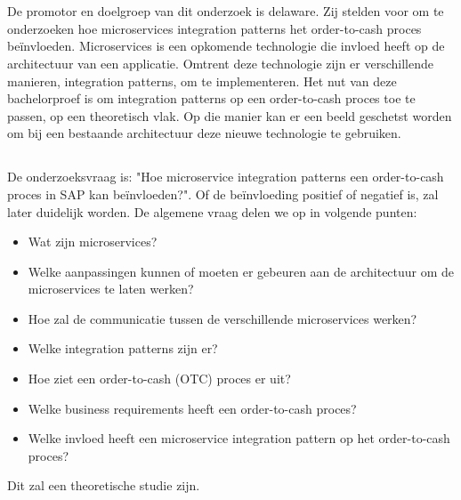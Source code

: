 
\chapter{}
\label{ch:inleiding}

\section{}
\label{sec:probleemstelling}
De promotor en doelgroep van dit onderzoek is delaware. Zij stelden voor om te onderzoeken hoe microservices integration patterns het order-to-cash proces beïnvloeden. Microservices is een opkomende technologie die invloed heeft op de architectuur van een applicatie. Omtrent deze technologie zijn er verschillende manieren, integration patterns, om te implementeren. Het nut van deze bachelorproef is om integration patterns op een order-to-cash proces toe te passen, op een theoretisch vlak. Op die manier kan er een beeld geschetst worden om bij een bestaande architectuur deze nieuwe technologie te gebruiken.

\section{}
\label{sec:onderzoeksvraag}
De onderzoeksvraag is: "Hoe microservice integration patterns een order-to-cash proces in SAP kan beïnvloeden?". Of de beïnvloeding positief of negatief is, zal later duidelijk worden. De algemene vraag delen we op in volgende punten:
\begin{itemize}
  \item Wat zijn microservices?
  \item Welke aanpassingen kunnen of moeten er gebeuren aan de architectuur om de microservices te laten werken?
  \item Hoe zal de communicatie tussen de verschillende microservices werken?
  \item Welke integration patterns zijn er?
  \item Hoe ziet een order-to-cash (OTC) proces er uit?
  \item Welke business requirements heeft een order-to-cash proces?
  \item Welke invloed heeft een microservice integration pattern op het order-to-cash proces?
\end{itemize}
Dit zal een theoretische studie zijn.

